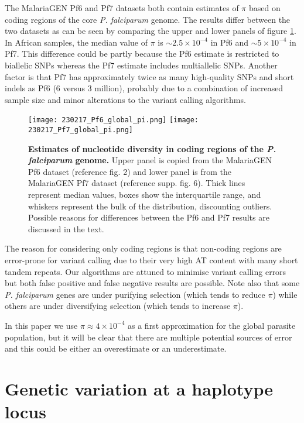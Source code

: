 \documentclass[_main.tex]{subfiles}
\begin{document}
The MalariaGEN Pf6 and Pf7 datasets \cite{MalariaGEN2021,MalariaGEN2023} both contain estimates of $\pi$ based on coding regions of the core \textit{P. falciparum} genome.  The results differ between the two datasets as can be seen by comparing the upper and lower panels of figure \ref{fig:Pf6_global_pi}.  In African samples, the median value of $\pi$ is $\sim 2.5 \times 10^{-4}$ in Pf6 and $\sim 5 \times 10^{-4} $ in Pf7.  This difference could be partly because the Pf6 estimate is restricted to biallelic SNPs whereas the Pf7 estimate includes multiallelic SNPs.  Another factor is that Pf7 has approximately twice as many high-quality SNPs and short indels as Pf6 (6 versus 3 million), probably due to a combination of increased sample size and minor alterations to the variant calling algorithms.

\begin{figure}[h!]
\centering
\texttt{[image: 230217\_Pf6\_global\_pi.png]}
\texttt{[image: 230217\_Pf7\_global\_pi.png]}
\caption{\textbf{Estimates of nucleotide diversity in coding regions of the \textit{P. falciparum} genome.}  Upper panel is copied from the MalariaGEN Pf6 dataset (reference \cite{MalariaGEN2021} fig. 2) and lower panel is from the MalariaGEN Pf7 dataset (reference \cite{MalariaGEN2023} supp. fig. 6).   Thick lines represent median values, boxes show the interquartile range, and whiskers represent the bulk of the distribution, discounting outliers.  Possible reasons for differences between the Pf6 and Pf7 results are discussed in the text.  
}
\label{fig:Pf6_global_pi}
\end{figure}

The reason for considering only coding regions is that non-coding regions are error-prone for variant calling due to their very high AT content with many short tandem repeats.  Our algorithms are attuned to minimise variant calling errors but both false positive and false negative results are possible. Note also that some \textit{P. falciparum} genes are under purifying selection (which tends to reduce $\pi$) while others are under diversifying selection (which tends to increase $\pi$).  

In this paper we use $\pi \approx 4 \times 10^{-4}$ as a first approximation for the global parasite population, but it will be clear that there are multiple potential sources of error and this could be either an overestimate or an underestimate. 


\section{Genetic variation at a haplotype locus}
\end{document}
